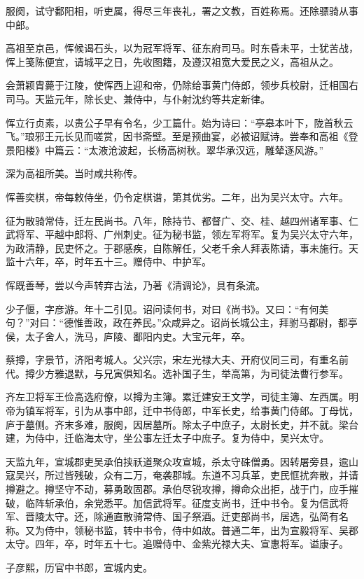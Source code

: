 \documentclass[12pt,UTF8]{ctexbook}
\begin{document}
服阕，试守鄱阳相，听吏属，得尽三年丧礼，署之文教，百姓称焉。还除骠骑从事中郎。

高祖至京邑，恽候谒石头，以为冠军将军、征东府司马。时东昏未平，士犹苦战，恽上笺陈便宜，请城平之日，先收图籍，及遵汉祖宽大爱民之义，高祖从之。

会萧颖胄薨于江陵，使恽西上迎和帝，仍除给事黄门侍郎，领步兵校尉，迁相国右司马。天监元年，除长史、兼侍中，与仆射沈约等共定新律。

恽立行贞素，以贵公子早有令名，少工篇什。始为诗曰：“亭皋本叶下，陇首秋云飞。”琅邪王元长见而嗟赏，因书斋壁。至是预曲宴，必被诏赋诗。尝奉和高祖《登景阳楼》中篇云：“太液沧波起，长杨高树秋。翠华承汉远，雕辇逐风游。”

深为高祖所美。当时咸共称传。

恽善奕棋，帝每敕侍坐，仍令定棋谱，第其优劣。二年，出为吴兴太守。六年。

征为散骑常侍，迁左民尚书。八年，除持节、都督广、交、桂、越四州诸军事、仁武将军、平越中郎将、广州刺史。征为秘书监，领左军将军。复为吴兴太守六年，为政清静，民吏怀之。于郡感疾，自陈解任，父老千余人拜表陈请，事未施行。天监十六年，卒，时年五十三。赠侍中、中护军。

恽既善琴，尝以今声转弃古法，乃著《清调论》，具有条流。

少子偃，字彦游。年十二引见。诏问读何书，对曰《尚书》。又曰：“有何美句？”对曰：“德惟善政，政在养民。”众咸异之。诏尚长城公主，拜驸马都尉，都亭侯，太子舍人，洗马，庐陵、鄱阳内史。大宝元年，卒。

蔡撙，字景节，济阳考城人。父兴宗，宋左光禄大夫、开府仪同三司，有重名前代。撙少方雅退默，与兄寅俱知名。选补国子生，举高第，为司徒法曹行参军。

齐左卫将军王俭高选府僚，以撙为主簿。累迁建安王文学，司徒主簿、左西属。明帝为镇军将军，引为从事中郎，迁中书侍郎，中军长史，给事黄门侍郎。丁母忧，庐于墓侧。齐末多难，服阕，因居墓所。除太子中庶子，太尉长史，并不就。梁台建，为侍中，迁临海太守，坐公事左迁太子中庶子。复为侍中，吴兴太守。

天监九年，宣城郡吏吴承伯挟祅道聚众攻宣城，杀太守硃僧勇。因转屠旁县，逾山寇吴兴，所过皆残破，众有二万，奄袭郡城。东道不习兵革，吏民恇扰奔散，并请撙避之。撙坚守不动，募勇敢固郡。承伯尽锐攻撙，撙命众出拒，战于门，应手摧破，临阵斩承伯，余党悉平。加信武将军。征度支尚书，迁中书令。复为信武将军、晋陵太守。还，除通直散骑常侍、国子祭酒。迁吏部尚书，居选，弘简有名称。又为侍中，领秘书监，转中书令，侍中如故。普通二年，出为宣毅将军、吴郡太守。四年，卒，时年五十七。追赠侍中、金紫光禄大夫、宣惠将军。谥康子。

子彦熙，历官中书郎，宣城内史。
\end{document}
